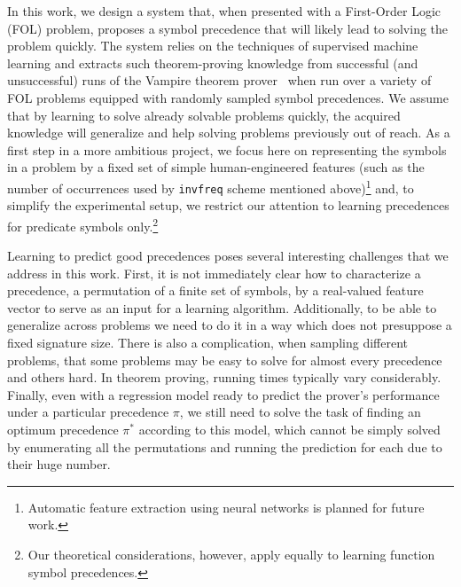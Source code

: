 \documentclass{ceurart}
\begin{document}
In this work, we design a system that, when presented with a First-Order Logic (FOL) problem,
proposes a symbol precedence that will likely lead to solving the problem quickly.
The system relies on the techniques of supervised machine learning and extracts
such theorem-proving knowledge from successful (and unsuccessful) runs of 
the Vampire theorem prover~\cite{Kovacs2013} when run over a variety of FOL problems equipped
with randomly sampled symbol precedences. 
We assume that by learning to solve already solvable problems quickly,
the acquired knowledge will generalize and help solving problems previously out of reach.
As a first step in a more ambitious project,
we focus here on representing the symbols in a problem by a fixed set of simple human-engineered features
(such as the number of occurrences used by \texttt{invfreq} scheme mentioned above)\footnote{Automatic
feature extraction using neural networks is planned for future work.}
and, to simplify the experimental setup, we restrict our attention to learning precedences for predicate symbols only.\footnote{Our theoretical considerations, however, apply equally to learning function symbol precedences.}

Learning to predict good precedences poses several interesting challenges that we address in this work.
First, it is not immediately clear how to characterize a precedence, a permutation of a finite set of symbols,
by a real-valued feature vector to serve as an input for a learning algorithm. 
Additionally, to be able to generalize across problems
we need to do it in a way which does not presuppose a fixed signature size. 
There is also a complication, when sampling different problems,
that some problems may be easy to solve for almost every precedence and others hard.
In theorem proving, running times typically vary considerably.
Finally, even with a regression model ready to predict the prover's performance 
under a particular precedence $\pi$, we still need to solve the task of finding 
an optimum precedence $\pi^*$ according to this model,
which cannot be simply solved by enumerating all the permutations and running the prediction for each
due to their huge number.

%	
\end{document}
